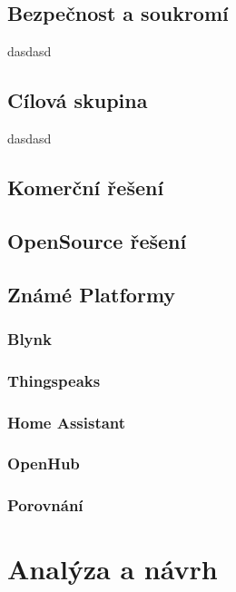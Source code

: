 \documentclass[thesis=B,czech]{FITthesis}[2019/12/23]
\begin{document}
    

\section{Bezpečnost a soukromí}
    dasdasd

\section{Cílová skupina}
    dasdasd

\section{Komerční řešení} %

\section{OpenSource řešení} %

\section{Známé Platformy}  %

\subsection{Blynk}

\subsection{Thingspeaks}

\subsection{Home Assistant}

\subsection{OpenHub}

\subsection{Porovnání}



\chapter{Analýza a návrh}
\end{document}
